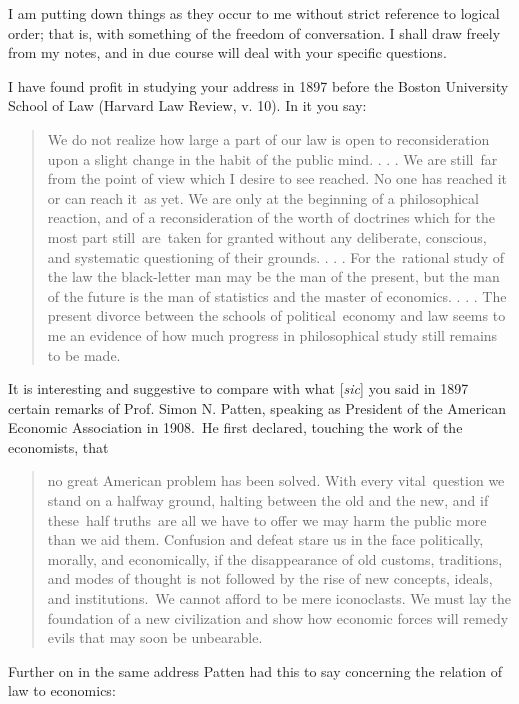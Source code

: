 \documentclass[twoside,symmetric,nobib,justified]{tufte-book}
\begin{document}
I am putting down things as they occur to me without strict reference to
logical order; that is, with something of the freedom of conversation. I
shall draw freely from my notes, and in due course will deal with your
specific questions.~

I have found profit in studying your address in 1897 before the Boston
University School of Law (Harvard Law Review, v. 10). In it you say:~

\begin{quote}
We do not realize how large a part of our law is open to reconsideration
upon a slight change in the habit of the public mind. . . . We are
still~far from the point of view which I desire to see reached. No one
has reached it or can reach it~as yet. We are only at the beginning of a
philosophical reaction, and of a reconsideration of the worth of
doctrines which for the most part still~are~taken for granted without
any deliberate, conscious, and systematic questioning of their grounds.
. . . For the~rational study of the law the black-letter man may be the
man of the present, but the man of the future is the man of statistics
and the master of economics. . . . The present divorce between the
schools of political~economy and law seems to me an evidence of how much
progress in philosophical study still remains to be made.~
\end{quote}

\newpage It is interesting and suggestive to compare with what {[}\emph{sic}{]}
you said in 1897 certain remarks of Prof. Simon N. Patten, speaking as
President of the American Economic Association in 1908.~He first
declared, touching the work of the economists, that~

\begin{quote}
no great American problem has been solved. With every vital~question we
stand on a halfway ground, halting between the old and the new, and if
these~half truths~are all we have to offer we may harm the public more
than we aid them. Confusion and defeat stare us in the face politically,
morally, and economically, if the disappearance of old customs,
traditions, and modes of thought is not followed by the rise of new
concepts, ideals, and institutions.~We cannot afford to be mere
iconoclasts. We must lay the foundation of a new civilization and show
how economic forces will remedy evils that may soon be unbearable.~
\end{quote}

Further on in the same address Patten had this to say concerning the
relation of law to economics:~
\end{document}
